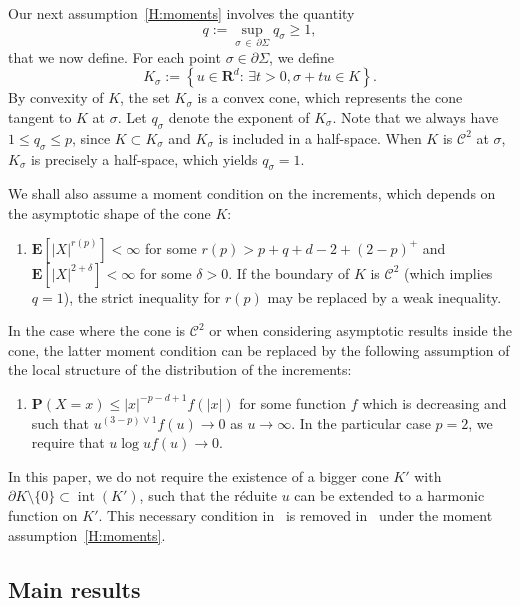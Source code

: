 \documentclass[AHL,Unicode,longabstracts,published]{cedram}
\DeclareMathOperator{\intl}{int}
\newcommand{\clC}{\mathcal{C}}
\newcommand{\pr}{\mathbf{P}}
\newcommand{\e}{\mathbf{E}}
\newcommand{\bfR}{\mathbf{R}}
\renewcommand{\le}{\leqslant}
\renewcommand{\leq}{\leqslant}
\renewcommand{\geq}{\geqslant}
\newcommand*{\relabel}{\renewcommand{\labelenumi}{(\theenumi)}}
\newcommand*{\Menumi}{\renewcommand*{\theenumi}{M\arabic{enumi}}\relabel}
\let\oldexists\exists
\renewcommand*{\exists}{\mathrel{\oldexists}}
\begin{document}
Our next assumption~\eqref{H:moments} involves the quantity
\[
q:=\sup_{\sigma\,\in\,\partial\Sigma}q_{\sigma}\geq 1,
\]
that we now define. For each point $\sigma\in\partial\Sigma$, we define
\begin{equation}\label{eq:def_K_sigma}
K_{\sigma}:=\left\{ u\in\bfR^d:\,\exists t>0, \sigma+tu\in K\right\}.
\end{equation}
By convexity of $K$, the set $K_{\sigma}$ is a convex cone, which represents the cone tangent to $K$ at $\sigma$. Let $q_{\sigma}$ denote the exponent of $K_{\sigma}$. Note that we always have $1\leq q_{\sigma}\leq p$, since $K\subset K_{\sigma}$ and $K_{\sigma}$ is included in a half-space. When $K$ is $\clC^{2}$ at $\sigma$, $K_{\sigma}$ is precisely a half-space, which yields $q_{\sigma}=1$.

We shall also assume a moment condition on the increments, which depends on the asymptotic shape of the cone $K$:
\begin{enumerate}\Menumi
\setcounter{enumi}{0}
\item\label{H:moments}
$\e[| X|^{r(p)}]<\infty$ for some $r(p)>p+q+d-2+(2-p)^{+}$ and $\e[| X|^{2+\delta}]<\infty$ for some $\delta>0$. If the boundary of $K$ is $\clC^{2}$ (which implies $q=1$), the strict inequality for $r(p)$ may be replaced by a weak inequality.
\end{enumerate}
In the case where the cone is $\clC^{2}$ or when considering asymptotic results inside the cone, the latter moment condition can be replaced by the following assumption of the local structure of the distribution of the increments:
\begin{enumerate}\Menumi
\setcounter{enumi}{1}
\item\label{local_assump}
$\pr(X=x)\le | x|^{-p-d+1}f(| x|)$ for some function $f$ which is decreasing and such that $u^{(3-p)\vee 1}f(u)\to 0$ as $u\to\infty$. In the particular case $p=2$, we require that $u\log uf(u)\to0$.
\end{enumerate}

In this paper, we do not require the existence of a bigger cone $K'$ with $\partial K\setminus\{ 0\}\subset \intl(K')$, such that the réduite $u$ can be extended to a harmonic function on $K'$. This necessary condition in~\cite{DeWa-15} is removed in~\cite{DeWa-19} under the moment assumption~\eqref{H:moments}.



\subsection*{Main results}
\end{document}
